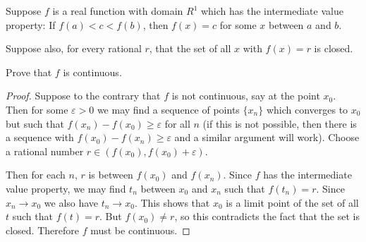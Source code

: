  Suppose $f$ is a real function with domain $R^1$ which
has the intermediate value property: If $f(a) < c < f(b)$, then
$f(x) = c$ for some $x$ between $a$ and $b$.

Suppose also, for every rational $r$, that the set of all $x$ with
$f(x) = r$ is closed.

Prove that $f$ is continuous.
\begin{proof}
  Suppose to the contrary that $f$ is not continuous, say at the point
  $x_0$. Then for some $\varepsilon > 0$ we may find a sequence of
  points $\{x_n\}$ which converges to $x_0$ but such that
  $f(x_n) - f(x_0) \geq \varepsilon$ for all $n$ (if this is not
  possible, then there is a sequence with
  $f(x_0) - f(x_n) \geq \varepsilon$ and a similar argument will
  work). Choose a rational number
  $r\in(f(x_0), f(x_0) + \varepsilon)$.

  Then for each $n$, $r$ is between $f(x_0)$ and $f(x_n)$. Since $f$
  has the intermediate value property, we may find $t_n$ between $x_0$
  and $x_n$ such that $f(t_n) = r$. Since $x_n\to x_0$ we also have
  $t_n\to x_0$. This shows that $x_0$ is a limit point of the set of
  all $t$ such that $f(t) = r$. But $f(x_0)\neq r$, so this
  contradicts the fact that the set is closed. Therefore $f$ must be
  continuous.
\end{proof}

